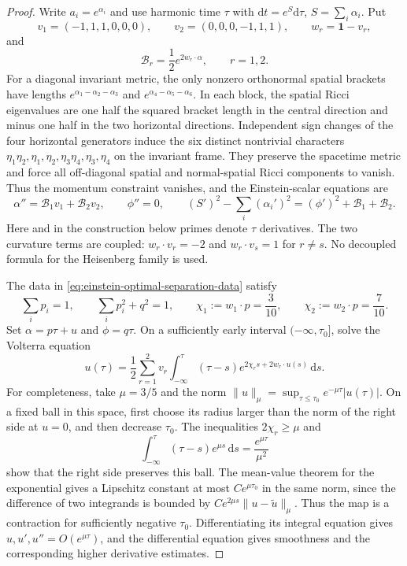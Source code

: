 \documentclass[10pt,a4paper]{amsart}
\newcommand{\dd}{\mathrm d}
\begin{document}
\begin{proof}
Write $a_i=e^{\alpha_i}$ and use harmonic time $\tau$ with
$\dd t=e^S\dd\tau$, $S=\sum_i\alpha_i$.  Put
\[
 v_1=(-1,1,1,0,0,0),\qquad
 v_2=(0,0,0,-1,1,1),\qquad
 w_r=\mathbf1-v_r,
\]
and
\[
 \mathcal B_r=\frac12 e^{2w_r\cdot\alpha},\qquad r=1,2.
\]
For a diagonal invariant metric, the only nonzero orthonormal
spatial brackets have lengths
$e^{\alpha_1-\alpha_2-\alpha_3}$ and
$e^{\alpha_4-\alpha_5-\alpha_6}$.  In each block, the spatial Ricci
eigenvalues are one half the squared bracket length in the central
direction and minus one half in the two horizontal directions.
Independent sign changes of the four horizontal generators induce
the six distinct nontrivial characters
$\eta_1\eta_2,\eta_1,\eta_2,\eta_3\eta_4,\eta_3,\eta_4$
on the invariant frame.  They preserve the spacetime metric and
force all off-diagonal spatial and normal-spatial Ricci components
to vanish.  Thus the momentum constraint vanishes, and the
Einstein-scalar equations are
\begin{equation}
 \alpha''=\mathcal B_1v_1+\mathcal B_2v_2,
 \qquad \phi''=0,
 \qquad
 (S')^2-\sum_i(\alpha_i')^2
       = (\phi')^2+\mathcal B_1+\mathcal B_2.
 \label{eq:einstein-product-heisenberg-ode}
\end{equation}
Here and in the construction below primes denote $\tau$ derivatives.
The two curvature terms are coupled:
$w_r\cdot v_r=-2$ and $w_r\cdot v_s=1$ for $r\ne s$.
No decoupled formula for the Heisenberg family is used.

The data in \eqref{eq:einstein-optimal-separation-data} satisfy
\[
 \sum_i p_i=1,\qquad \sum_i p_i^2+q^2=1,\qquad
 \chi_1:=w_1\cdot p=\frac3{10},\qquad
 \chi_2:=w_2\cdot p=\frac7{10}.
\]
Set $\alpha=p\tau+u$ and $\phi=q\tau$.  On a sufficiently early
interval $(-\infty,\tau_0]$, solve the Volterra equation
\begin{equation}
 u(\tau)=\frac12\sum_{r=1}^2v_r
   \int_{-\infty}^{\tau}(\tau-s)
     e^{2\chi_rs+2w_r\cdot u(s)}\,\dd s.
 \label{eq:einstein-product-heisenberg-volterra}
\end{equation}
For completeness, take $\mu=3/5$ and the norm
$\|u\|_\mu=\sup_{\tau\le\tau_0}e^{-\mu\tau}|u(\tau)|$.
On a fixed ball in this space, first choose its radius larger than
the norm of the right side at $u=0$, and then decrease $\tau_0$.
The inequalities $2\chi_r\ge\mu$ and
\[
 \int_{-\infty}^{\tau}(\tau-s)e^{\mu s}\,\dd s
       =\frac{e^{\mu\tau}}{\mu^2}
\]
show that the right side preserves this ball.  The mean-value theorem
for the exponential gives a Lipschitz constant at most
$C e^{\mu\tau_0}$ in the same norm, since the difference of two
integrands is bounded by
$C e^{2\mu s}\|u-\widetilde u\|_\mu$.
Thus the map is a contraction for sufficiently negative $\tau_0$.
Differentiating its integral equation gives
$u,u',u''=O(e^{\mu\tau})$, and the differential equation gives
smoothness and the corresponding higher derivative estimates.


\end{proof}
\end{document}

